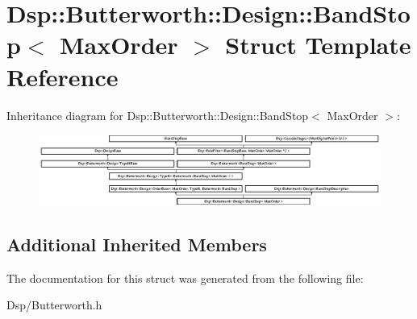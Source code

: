 \hypertarget{structDsp_1_1Butterworth_1_1Design_1_1BandStop}{\section{Dsp\-:\-:Butterworth\-:\-:Design\-:\-:Band\-Stop$<$ Max\-Order $>$ Struct Template Reference}
\label{structDsp_1_1Butterworth_1_1Design_1_1BandStop}
}
Inheritance diagram for Dsp\-:\-:Butterworth\-:\-:Design\-:\-:Band\-Stop$<$ Max\-Order $>$\-:\begin{figure}[H]
\begin{center}
\leavevmode
\includegraphics[height=2.318841cm]{structDsp_1_1Butterworth_1_1Design_1_1BandStop}
\end{center}
\end{figure}
\subsection*{Additional Inherited Members}


The documentation for this struct was generated from the following file\-:\begin{DoxyCompactItemize}
\item 
Dsp/Butterworth.\-h\end{DoxyCompactItemize}

